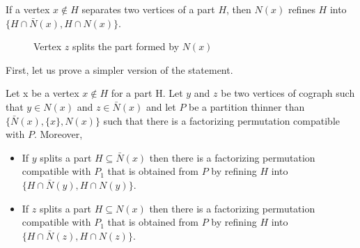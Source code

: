  \begin{definition}
If a vertex $x \notin H$ separates two vertices of a part $H$, then $N(x)$ refines $H$ into  $\{  H \cap \bar{N}(x), H \cap N(x) \}$.
\label{Rule 2}
\end{definition}

\begin{figure}
    \centering
    
    \caption{Vertex $z$ splits the part formed by $N(x)$}
    \label{fig:Vertex $z$ splits the part formed by $N(x)$}
\end{figure} 

First, let us prove a simpler version of the statement.

\begin{theorem}
    Let x be a vertex $x \notin H$ for a part H. Let $y$ and $z$ be two vertices of cograph such that $y \in N(x)$ and $z \in \bar{N}(x)$ 
    and let $P$ be a partition thinner than $\{\bar{N}(x),\{x\} ,N(x) \}$ such that there is a factorizing permutation compatible with $P$. Moreover,
    \begin{itemize}
        \item If $y$ splits a part $H \subseteq \bar{N}(x)$ then there is a factorizing permutation compatible with $P_1$ that is obtained from $P$ by refining
        $H$ into $\{  H \cap \bar{N}(y), H \cap N(y) \}$.
        \item If $z$ splits a part $H \subseteq N(x)$ then there is a factorizing permutation compatible with $P_1$ that is obtained from $P$ by refining
        $H$ into $\{  H \cap \bar{N}(z), H \cap N(z) \}$.
    \end{itemize}
    \label{General case for the Rule 2}
\end{theorem}




